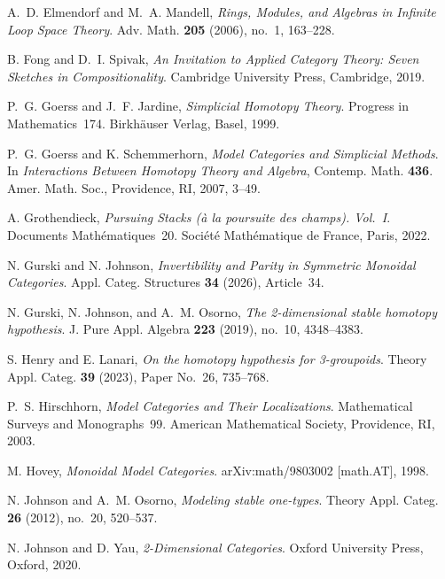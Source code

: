 \documentclass{tac}
\begin{document}
\begin{references*}
A.~D. Elmendorf and M.~A. Mandell,
\emph{Rings, Modules, and Algebras in Infinite Loop Space Theory}.
Adv. Math. \textbf{205} (2006), no.~1, 163--228.

B. Fong and D.~I. Spivak,
\emph{An Invitation to Applied Category Theory: Seven Sketches in Compositionality}.
Cambridge University Press, Cambridge, 2019.

P.~G. Goerss and J.~F. Jardine,
\emph{Simplicial Homotopy Theory}.
Progress in Mathematics~174.
Birkh\"auser Verlag, Basel, 1999.

P.~G. Goerss and K. Schemmerhorn,
\emph{Model Categories and Simplicial Methods}.
In \emph{Interactions Between Homotopy Theory and Algebra},
Contemp. Math. \textbf{436}.
Amer. Math. Soc., Providence, RI, 2007, 3--49.

A. Grothendieck,
\emph{Pursuing Stacks (\`a la poursuite des champs). Vol.~I}.
Documents Math\'ematiques~20.
Soci\'et\'e Math\'ematique de France, Paris, 2022.

N. Gurski and N. Johnson,
\emph{Invertibility and Parity in Symmetric Monoidal Categories}.
Appl. Categ. Structures \textbf{34} (2026), Article~34.

N. Gurski, N. Johnson, and A.~M. Osorno,
\emph{The 2-dimensional stable homotopy hypothesis}.
J. Pure Appl. Algebra \textbf{223} (2019), no.~10, 4348--4383.

S. Henry and E. Lanari,
\emph{On the homotopy hypothesis for 3-groupoids}.
Theory Appl. Categ. \textbf{39} (2023), Paper No.~26, 735--768.

P.~S. Hirschhorn,
\emph{Model Categories and Their Localizations}.
Mathematical Surveys and Monographs~99.
American Mathematical Society, Providence, RI, 2003.

M. Hovey,
\emph{Monoidal Model Categories}.
arXiv:math/9803002 [math.AT], 1998.

N. Johnson and A.~M. Osorno,
\emph{Modeling stable one-types}.
Theory Appl. Categ. \textbf{26} (2012), no.~20, 520--537.

N. Johnson and D. Yau,
\emph{2-Dimensional Categories}.
Oxford University Press, Oxford, 2020.


\end{references*}
\end{document}
